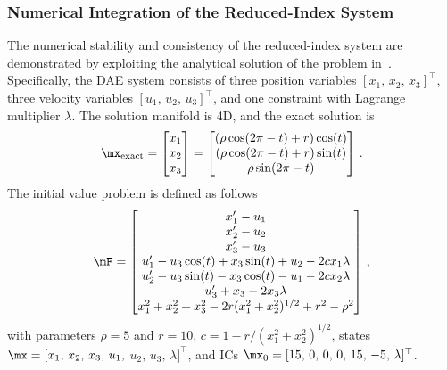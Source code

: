 \subsubsection{Numerical Integration of the Reduced-Index System}
\label{chap4:sec:numerical_integration}

The numerical stability and consistency of the reduced-index system are demonstrated by exploiting the analytical solution of the problem in~\cite{campbell1995constraint}. Specifically, the \ac{DAE} system consists of three position variables $[x_{1}, \, x_{2}, \, x_{3}]^\top$, three velocity variables $[u_{1}, \, u_{2}, \, u_{3}]^\top$, and one constraint with Lagrange multiplier $\lambda$. The solution manifold is 4D, and the exact solution is
%
\begin{equation*}
  \mx_\text{exact} = \begin{bmatrix}
    x_{1} \\ x_{2} \\ x_{3}
  \end{bmatrix} = \begin{bmatrix}
    (\rho \cos(2\pi - t) + r) \cos(t) \\
    (\rho \cos(2\pi - t) + r) \sin(t) \\
    \rho \sin(2\pi - t)
  \end{bmatrix} \, \text{.}
\end{equation*}
%
The initial value problem is defined as follows
%
\begin{equation}
  \label{chap4:eq:torus}
  \mF = \begin{bmatrix}
    x^{\prime}_{1} - u_{1} \\
    x^{\prime}_{2} - u_{2} \\
    x^{\prime}_{3} - u_{3} \\
    u^{\prime}_{1} - u_{3}\cos(t) + x_{3}\sin(t) + u_{2} - 2 c x_{1}\lambda \\
    u^{\prime}_{2} - u_{3}\sin(t) - x_{3}\cos(t) - u_{1} - 2 c x_{2}\lambda \\
    u^{\prime}_{3} + x_{3} - 2x_{3}\lambda \\
    x_{1}^2 + x_{2}^2 + x_{3}^2 - 2r(x_{1}^2 + x_{2}^2)^{1/2} + r^2 - \rho^2
  \end{bmatrix} \, \text{,}
\end{equation}
%
with parameters $\rho = 5$ and $r = 10$, $c = 1 - {r} / {(x_{1}^2 + x_{2}^2)^{1/2}}$, states $\mx = [x_{1}, \, x_{2}, \, x_{3}, \, u_{1},$ $u_{2}, \, u_{3}, \, \lambda]^{\top}$, and \acp{IC} $\mx_{0} = [15, \, 0, \, 0, \, 0, \, 15, \, -5, \, \lambda]^{\top}$.

